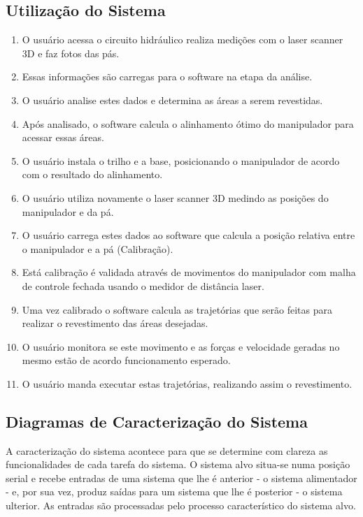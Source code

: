 \documentclass[12pt,a4paper]{article}
\begin{document}
\subsection {Utilização do Sistema}
\begin {enumerate}
  \item O usuário acessa o circuito hidráulico realiza medições com o laser scanner 3D e faz fotos das pás.
  \item Essas informações são carregas para o software na etapa da análise.
  \item O usuário analise estes dados e determina as áreas a serem revestidas.
  \item Após analisado, o software calcula o alinhamento ótimo do manipulador
para acessar essas áreas.
  \item O usuário instala o trilho e a base, posicionando o manipulador de
  acordo com o resultado do alinhamento.
  \item O usuário utiliza novamente o laser scanner 3D medindo as posições do
manipulador e da pá.
  \item O usuário carrega estes dados ao software que calcula a posição relativa
  entre o manipulador e a pá (Calibração).
  \item Está calibração é validada através de movimentos do manipulador com
  malha de controle fechada usando o medidor de distância laser.
  \item Uma vez calibrado o software calcula as trajetórias que serão feitas
  para realizar o revestimento das áreas desejadas.
  \item O usuário monitora se este movimento e as forças e velocidade geradas no
  mesmo estão de acordo funcionamento esperado.
  \item O usuário manda executar estas trajetórias, realizando assim o
  revestimento. 
\end{enumerate}



\subsection {Diagramas de Caracterização do Sistema}
A caracterização do sistema acontece para que se determine com clareza as
funcionalidades de cada tarefa do sistema. O sistema alvo situa-se numa posição serial e recebe entradas de 
uma sistema que lhe é anterior - o sistema alimentador - e, por sua vez, produz saídas para um sistema que 
lhe é posterior - o sistema ulterior. As entradas são processadas pelo processo característico do sistema alvo.
\end{document}
